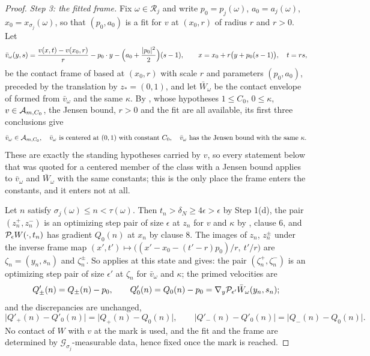 \begin{proof}
\emph{Step 3: the fitted frame.}
Fix $\omega\in\mathcal R_j$ and write $p_0=p_j(\omega)$, $a_0=a_j(\omega)$,
$x_0=x_{\sigma_j}(\omega)$, so that $(p_0,a_0)$ is a fit for $v$ at $(x_0,r)$
of radius $r$ and $r>0$. Let
\[
  \bar v_\omega(y,s)=\frac{v(x,t)-v(x_0,r)}{r}
     -p_0\cdot y-\Bigl(a_0+\frac{|p_0|^2}{2}\Bigr)(s-1),
  \qquad x=x_0+r\bigl(y+p_0(s-1)\bigr),\quad t=rs,
\]
be the contact frame of  based at $(x_0,r)$ with scale
$r$ and parameters $(p_0,a_0)$, preceded by the translation by $z_*=(0,1)$, and
let $\bar W_\omega$ be the contact envelope of  formed from
$\bar v_\omega$ and the same $\kappa$. By ,
whose hypotheses $1\le C_0$, $0\le\kappa$, $v\in\mathcal{A}_{m,C_0}$, the Jensen
bound, $r>0$ and the fit are all available, its first three conclusions give
\begin{equation}\label{eq:ml-frame-class}
  \bar v_\omega\in\mathcal{A}_{m,C_0},\quad
  \bar v_\omega\text{ is centered at }(0,1)\text{ with constant }C_0,\quad
  \bar v_\omega\text{ has the Jensen bound with the same }\kappa .
\end{equation}
These are exactly the standing hypotheses carried by $v$, so every statement
below that was quoted for a centered member of the class with a Jensen bound
applies to $\bar v_\omega$ and $\bar W_\omega$ with the same constants; this is
the only place the frame enters the constants, and it enters not at all.

Let $n$ satisfy $\sigma_j(\omega)\le n<\tau(\omega)$. Then $t_n>\delta_N\ge
4\epsilon>\epsilon$ by Step 1(d), the pair $(z^+_n,z^-_n)$ is an optimizing
step pair of size $\epsilon$ at $z_n$ for $v$ and $\kappa$ by
, clause 6, and $\mathcal{P}_\epsilon W(\cdot,t_n)$ has
gradient $Q_0(n)$ at $x_n$ by clause 8. The images of $z_n$, $z^\pm_n$ under
the inverse frame map
$(x',t')\mapsto\bigl((x'-x_0-(t'-r)p_0)/r,\ t'/r\bigr)$ are
$\zeta_n=(y_n,s_n)$ and $\zeta^\pm_n$. So
 applies at this state and gives: the pair
$(\zeta^+_n,\zeta^-_n)$ is an optimizing step pair of size $\epsilon'$ at
$\zeta_n$ for $\bar v_\omega$ and $\kappa$; the primed velocities are
\begin{equation}\label{eq:ml-primed-velocities}
  Q'_\pm(n)=Q_\pm(n)-p_0,\qquad
  Q'_0(n)=Q_0(n)-p_0
   =\nabla_y\mathcal{P}_{\epsilon'}\bar W_\omega(y_n,s_n);
\end{equation}
and the discrepancies are unchanged,
\begin{equation}\label{eq:ml-same-discrepancies}
  \bigl|Q'_+(n)-Q'_0(n)\bigr|=\bigl|Q_+(n)-Q_0(n)\bigr|,\qquad
  \bigl|Q'_-(n)-Q'_0(n)\bigr|=\bigl|Q_-(n)-Q_0(n)\bigr| .
\end{equation}
No contact of $W$ with $v$ at the mark is used, and the fit and the frame are
determined by $\mathcal G_{\sigma_j}$-measurable data, hence fixed once the
mark is reached.


\end{proof}
